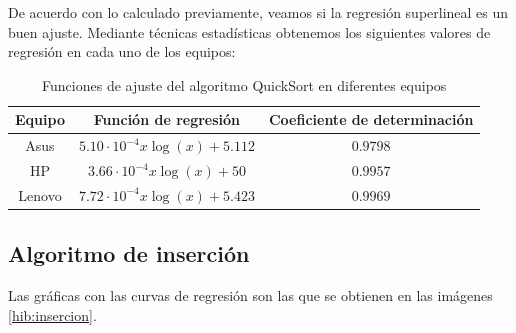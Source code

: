 \documentclass{homework}
\begin{document}
    De acuerdo con lo calculado previamente, veamos si la regresión superlineal es un buen ajuste. Mediante técnicas estadísticas
    obtenemos los siguientes valores de regresión en cada uno de los equipos:

    \begin{table}[H]
        \centering
        \begin{tabular}{|c|c|c|}
            \hline
            Equipo & Función de regresión & Coeficiente de determinación \\
            \hline
            Asus & $5.10 \cdot 10^{-4} x \log(x) + 5.112$ & $0.9798$ \\
            HP & $3.66 \cdot 10^{-4} x \log(x) + 50$ & $0.9957$ \\
            Lenovo & $7.72 \cdot 10^{-4} x \log(x) + 5.423$ & $0.9969$ \\
            \hline
        \end{tabular}
        \caption{Funciones de ajuste del algoritmo QuickSort en diferentes equipos}
    \end{table}

    \subsection{Algoritmo de inserción}

    Las gráficas con las curvas de regresión son las que se obtienen en las imágenes \ref{hib:insercion}.
\end{document}
